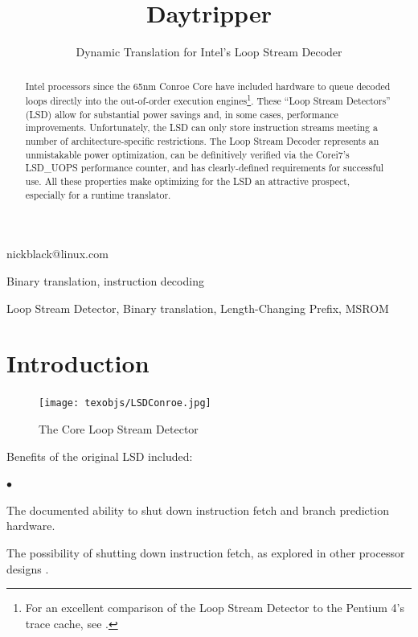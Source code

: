 \documentclass[]{sigplanconf}
\newcommand{\squishlist}{\begin{list}{$\bullet$}
  {\setlength{\itemsep}{0pt}
    \setlength{\parsep}{3pt}
    \setlength{\topsep}{3pt}
    \setlength{\partopsep}{0pt}
    \setlength{\leftmargin}{1.5em}
    \setlength{\labelwidth}{1em}
    \setlength{\labelsep}{0.5em}}}
\newcommand{\squishend}{\end{list}}
\begin{document}

\title{Daytripper}
\subtitle{Dynamic Translation for Intel's Loop Stream Decoder}

           {nickblack@linux.com}

\maketitle

\begin{abstract}
Intel processors since the 65nm Conroe Core
have included hardware to queue decoded loops directly into the out-of-order
execution engines\footnote{For an excellent comparison of the Loop Stream
Detector to the Pentium 4's trace cache, see \cite{kanter}.}. These ``Loop
Stream Detectors'' (LSD) allow for substantial power savings and, in some
cases, performance improvements. Unfortunately, the LSD can only store
instruction streams meeting a number of architecture-specific restrictions.
The Loop Stream Decoder represents an unmistakable power optimization, can be
definitively verified via the Core\texttrademark i7's LSD\_UOPS performance
counter, and has clearly-defined requirements for successful use. All these
properties make optimizing for the LSD an attractive prospect, especially for
a runtime translator.
\end{abstract}


\terms
Binary translation, instruction decoding

\keywords
Loop Stream Detector, Binary translation, Length-Changing Prefix, MSROM

\section{Introduction}
\cite{inteloptimize}
\begin{figure}[h]
\texttt{[image: texobjs/LSDConroe.jpg]}
\caption{The Core Loop Stream Detector}
\label{fig:lsdcorei7}
\end{figure}
Benefits of the original LSD included:
\squishlist
\item The documented ability to shut down instruction fetch and branch prediction hardware.
\item The possibility of shutting down instruction fetch, as explored in other
processor designs \cite{badulescu}.
\squishend
\end{document}
